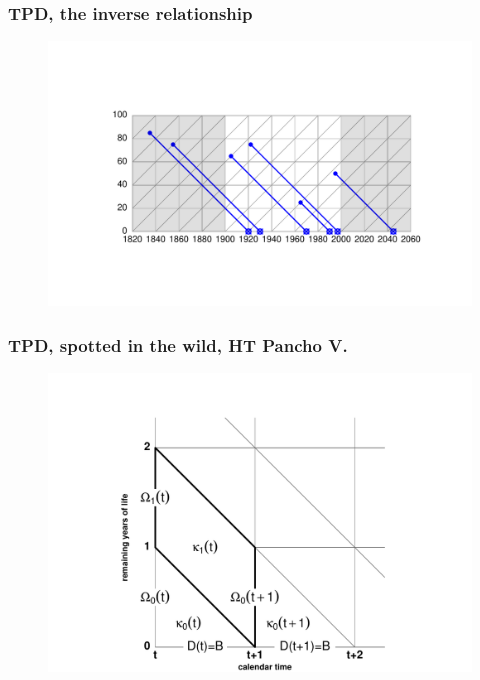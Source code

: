\documentclass[20pt]{beamer}
\begin{document}
\begin{frame}
\frametitle{TPD, the inverse relationship}
\begin{figure}[b]
    \centering
    \includegraphics{Figures/LabPres/TPD2.pdf}
\end{figure} 
\end{frame}

\begin{frame}
\frametitle{TPD, spotted in the wild, HT Pancho V.}
\begin{figure}[b]
    \centering
    \includegraphics{Figures/LabPres/TPDexample_Pancho.pdf}
\end{figure} 
\end{frame}
\end{document}
